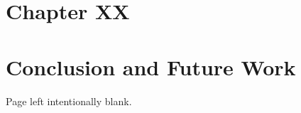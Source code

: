 \documentclass[11pt]{report}
\begin{document}
\chapter{Chapter XX}


\chapter{Conclusion and Future Work}


\newpage
{} 
{} 
\printbibliography[title={References}]

\appendix


\newpage
	\begin{center}
	\thispagestyle{empty}
	\vspace*{\fill}
	Page left intentionally blank.
	\vspace*{\fill}
	\end{center}
\newpage
\end{document}
